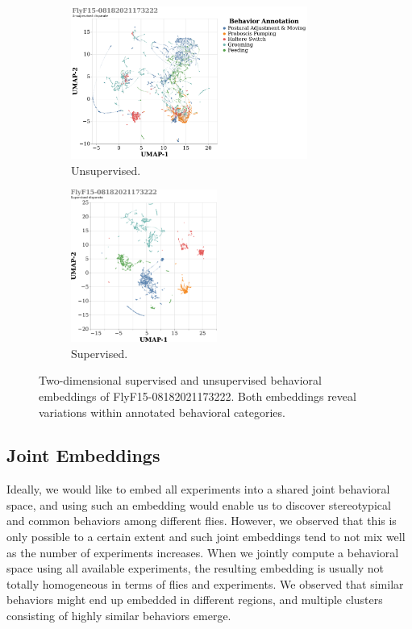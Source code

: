 \begin{figure}[htb!]
	\centering
	\begin{subfigure}[b]{0.5\linewidth}
		\centering\includegraphics[height=5cm]{figures/FlyF15-08182021173222_UnsupervisedDisparateEmbedding.pdf}
		\caption{Unsupervised. \label{figure:unsupervised-disparate-behavioral-regions}}
	\end{subfigure}%
	\hfill
	\centering
	\begin{subfigure}[b]{0.5\linewidth}
		\centering\includegraphics[height=5cm]{figures/FlyF15-08182021173222_SupervisedDisparateEmbedding.pdf}
		\caption{Supervised. \label{figure:supervised-disparate-zoomin-annotations}}
	\end{subfigure}%
	\caption[Supervised and unsupervised embeddings of FlyF15-08182021173222.]{Two-dimensional supervised and unsupervised behavioral embeddings of FlyF15-08182021173222. Both embeddings reveal variations within annotated behavioral categories.}
\end{figure}

\subsection{Joint Embeddings}\label{section:joint-embeddings}
Ideally, we would like to embed all experiments into a shared joint behavioral space, and using such an embedding would enable us to discover stereotypical and common behaviors among different flies.
However, we observed that this is only possible to a certain extent and such joint embeddings tend to not mix well as the number of experiments increases.
When we jointly compute a behavioral space using all available experiments,  the resulting embedding is usually not totally homogeneous in terms of flies and experiments.
We observed that similar behaviors might end up embedded in different regions, and multiple clusters consisting of highly similar behaviors emerge.

